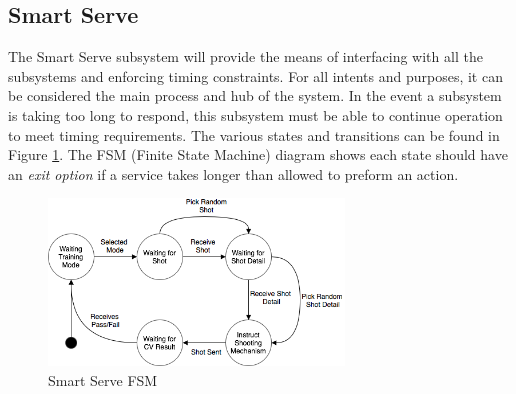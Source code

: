 \documentclass[11pt]{article}
\begin{document}
\subsection{Smart Serve}
The Smart Serve subsystem will provide the means of interfacing with all the subsystems and enforcing timing constraints. For all intents and purposes, it can be considered the main process and hub of the system. In the event a subsystem is taking too long to respond, this subsystem must be able to continue operation to meet timing requirements. The various states and transitions can be found in Figure \ref{fig:fsm}. The FSM (Finite State Machine) diagram shows each state should have an \textit{exit option} if a service takes longer than allowed to preform an action.
\begin{figure}[H]
   \centering
   \includegraphics[width=0.7\textwidth]{img/FSM.png}
   \caption{Smart Serve FSM}
   \label{fig:fsm}
\end{figure}
\end{document}
